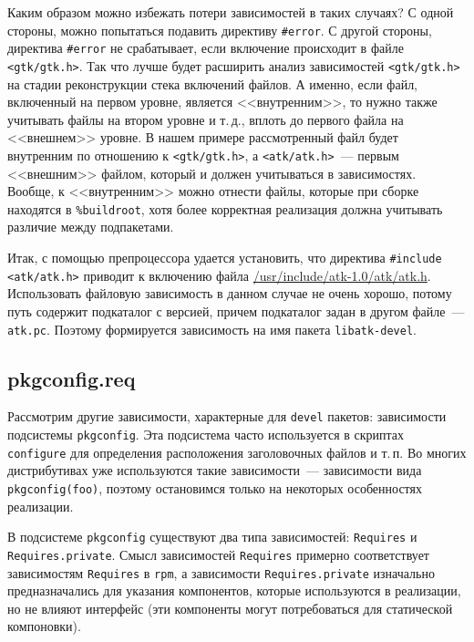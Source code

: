 \documentclass[russian,a4paper,12pt,titlepage]{article}
\begin{document}
Каким образом можно избежать потери зависимостей в таких случаях?  С одной стороны, можно попытаться подавить
директиву \verb|#error|.  С другой стороны, директива \verb|#error| не срабатывает, если включение происходит в файле
\verb|<gtk/gtk.h>|.  Так что лучше будет расширить анализ зависимостей \verb|<gtk/gtk.h>| на стадии реконструкции стека
включений файлов.  А именно, если файл, включенный на первом уровне, является <<внутренним>>, то нужно также учитывать
файлы на втором уровне и т.\,д., вплоть до первого файла на <<внешнем>> уровне.  В нашем примере рассмотренный файл
будет внутренним по отношению к \verb|<gtk/gtk.h>|, а \verb|<atk/atk.h>|~--- первым <<внешним>> файлом, который
и должен учитываться в зависимостях.  Вообще, к <<внутренним>> можно отнести файлы, которые при сборке находятся
в \verb|%buildroot|, хотя более корректная реализация должна учитывать различие между подпакетами.

Итак, с помощью препроцессора удается установить, что директива \verb|#include <atk/atk.h>| приводит к включению
файла \url{/usr/include/atk-1.0/atk/atk.h}.  Использовать файловую зависимость в данном случае
не очень хорошо, потому путь содержит подкаталог с версией, причем подкаталог задан в другом файле~--- \verb|atk.pc|.
Поэтому формируется зависимость на имя пакета \verb|libatk-devel|.

\subsection{pkgconfig.req}
Рассмотрим другие зависимости, характерные для \verb|devel| пакетов: зависимости подсистемы \verb|pkgconfig|.
Эта подсистема часто используется в скриптах \verb|configure| для определения расположения заголовочных файлов и т.\,п.
Во многих дистрибутивах уже используются такие зависимости~--- зависимости вида \verb|pkgconfig(foo)|,
поэтому остановимся только на некоторых особенностях реализации.

В подсистеме \verb|pkgconfig| существуют два типа зависимостей: \verb|Requires| и \verb|Requires.private|.
Смысл зависимостей \verb|Requires| примерно соответствует зависимостям \verb|Requires| в \verb|rpm|,
а зависимости \verb|Requires.private| изначально предназначались для указания компонентов, которые используются
в реализации, но не влияют интерфейс (эти компоненты могут потребоваться для статической компоновки).
\end{document}
